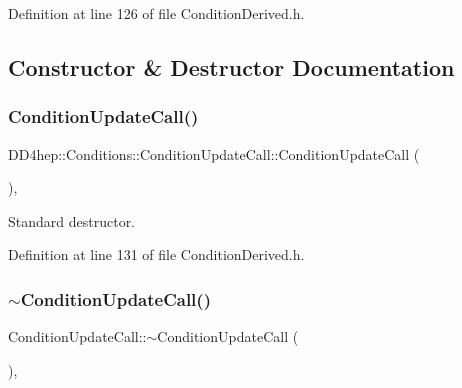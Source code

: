 Definition at line 126 of file Condition\+Derived.\+h.



\subsection{Constructor \& Destructor Documentation}
\hypertarget{class_d_d4hep_1_1_conditions_1_1_condition_update_call_a23a8cb42aaec80443044176c061f5281}{}\label{class_d_d4hep_1_1_conditions_1_1_condition_update_call_a23a8cb42aaec80443044176c061f5281} 
\subsubsection{\texorpdfstring{Condition\+Update\+Call()}{ConditionUpdateCall()}}
{\footnotesize\ttfamily D\+D4hep\+::\+Conditions\+::\+Condition\+Update\+Call\+::\+Condition\+Update\+Call (\begin{DoxyParamCaption}{ }\end{DoxyParamCaption})\hspace{0.3cm}{\ttfamily [inline]}, {\ttfamily [protected]}}



Standard destructor. 



Definition at line 131 of file Condition\+Derived.\+h.

\hypertarget{class_d_d4hep_1_1_conditions_1_1_condition_update_call_a1dd8b3414b91f74877af4325c0a0e3c4}{}\label{class_d_d4hep_1_1_conditions_1_1_condition_update_call_a1dd8b3414b91f74877af4325c0a0e3c4} 
\subsubsection{\texorpdfstring{$\sim$\+Condition\+Update\+Call()}{~ConditionUpdateCall()}}
{\footnotesize\ttfamily Condition\+Update\+Call\+::$\sim$\+Condition\+Update\+Call (\begin{DoxyParamCaption}{ }\end{DoxyParamCaption})\hspace{0.3cm}{\ttfamily [protected]}, {\ttfamily [virtual]}}



